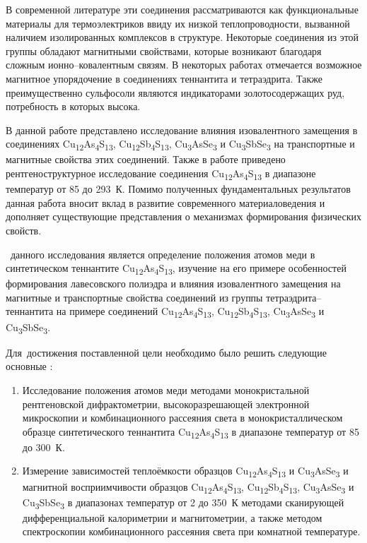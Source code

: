 В современной литературе эти соединения рассматриваются как функциональные материалы для термоэлектриков ввиду их низкой теплопроводности, вызванной наличием изолированных комплексов в структуре.
Некоторые соединения из этой группы обладают магнитными свойствами, которые возникают благодаря сложным ионно--ковалентным связям. В некоторых работах отмечается возможное магнитное упорядочение в соединениях теннантита и тетраэдрита.
Также преимущественно сульфосоли являются индикаторами золотосодержащих руд, потребность в которых высока.

В данной работе представлено исследование влияния изовалентного замещения в соединениях Cu\textsubscript{12}As\textsubscript{4}S\textsubscript{13}, Cu\textsubscript{12}Sb\textsubscript{4}S\textsubscript{13}, Cu\textsubscript{3}AsSe\textsubscript{3} и Cu\textsubscript{3}SbSe\textsubscript{3} на транспортные и магнитные свойства этих соединений.
Также в работе приведено рентгеноструктурное исследование соединения  Cu\textsubscript{12}As\textsubscript{4}S\textsubscript{13} в диапазоне температур от 85 до 293~К.  Помимо полученных фундаментальных результатов данная работа вносит вклад в развитие современного материаловедения и дополняет существующие представления о механизмах формирования физических свойств.

 \aim\ данного исследования является определение положения атомов меди в синтетическом теннантите
 Cu\textsubscript{12}As\textsubscript{4}S\textsubscript{13}, изучение на его примере особенностей формирования лавесовского полиэдра и влияния изовалентного замещения на магнитные и транспортные свойства соединений из группы тетраэдрита--теннантита на примере соединений  Cu\textsubscript{12}As\textsubscript{4}S\textsubscript{13}, Cu\textsubscript{12}Sb\textsubscript{4}S\textsubscript{13}, Cu\textsubscript{3}AsSe\textsubscript{3} и Cu\textsubscript{3}SbSe\textsubscript{3}.

Для~достижения поставленной цели необходимо было решить следующие основные {\tasks}:
\begin{enumerate}
  \item Исследование положения атомов меди методами монокристальной рентгеновской дифрактометрии, высокоразрешающей электронной микроскопии и комбинационного рассеяния света в монокристаллическом образце синтетического теннантита Cu\textsubscript{12}As\textsubscript{4}S\textsubscript{13} в диапазоне температур от 85 до 300~К.
  \item Измерение зависимостей теплоёмкости образцов Cu\textsubscript{12}As\textsubscript{4}S\textsubscript{13} и Cu\textsubscript{3}AsSe\textsubscript{3} и магнитной восприимчивости  образцов Cu\textsubscript{12}As\textsubscript{4}S\textsubscript{13}, Cu\textsubscript{12}Sb\textsubscript{4}S\textsubscript{13}, Cu\textsubscript{3}AsSe\textsubscript{3} и Cu\textsubscript{3}SbSe\textsubscript{3} в диапазонах температур от 2  до 350~К методами сканирующей дифференциальной калориметрии и магнитометрии, а также методом спектроскопии комбинационного рассеяния света при комнатной температуре.

\end{enumerate}

